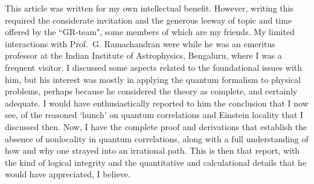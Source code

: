 This article was written for my own intellectual benefit. However, writing this required
the considerate invitation and the generous leeway of topic and time offered by the 
``GR-team", some members of which are my friends. My limited interactions with Prof.\ G.
Ramachandran were while he was an emeritus professor at the Indian Institute of Astrophysics, Bengaluru, where I was a frequent visitor. I discussed some aspects related to the
foundational issues with him, but his interest was mostly in applying the quantum formalism to physical problems, perhaps because he considered the theory as complete, and certainly adequate. I would have enthusiastically reported to him the conclusion that I now see, of the reasoned
`hunch' on quantum correlations and Einstein locality that I discussed then. Now, I have
the complete proof and derivations that establish the absence of nonlocality in quantum
correlations, along with a full understanding of how and why one strayed into an irrational
path. This is then that report, with the kind of logical integrity and the quantitative and
calculational details that he would have appreciated, I believe.

